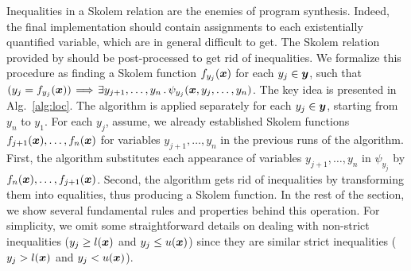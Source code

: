Inequalities in a Skolem relation are the enemies  of program synthesis.
Indeed, the final implementation should contain assignments to each
existentially quantified variable, which are in general difficult to
get. 
The Skolem relation provided by \aeval should be post-processed to get rid of inequalities.
We formalize this procedure as finding a Skolem function $f_{y_j}(\vx)$ for each $y_j\in \vy$, such that $(y_j = f_{y_j}(\vx)) \!\implies\! \exists y_{j+1},\ldots,y_{n} \such \psi_{y_j}(\vx,y_{j},\ldots,y_{n}) $.
The key idea is presented in Alg.~\ref{alg:loc}.
The algorithm is applied separately for each $y_j \in \vy$, starting from $y_n$ to $y_1$.
For each $y_j$, assume, we already established Skolem functions $f_{j+1}(\vx),\ldots,f_{n}(\vx)$ for variables $y_{j+1},\ldots,y_n$ in the previous runs of the algorithm. 
%
First, the algorithm substitutes each appearance of variables $y_{j+1},\ldots, y_{n}$ in $\psi_{y_j}$ by $f_{n}(\vx),\ldots,f_{j+1}(\vx)$.
Second, %
%
the algorithm gets rid of inequalities by transforming them into
equalities, thus producing a Skolem function. 
In the rest of the section, we show several fundamental rules and properties behind this operation.
For simplicity, we omit some straightforward details on dealing with
non-strict inequalities ($y_j \ge l(\vx)$ and $y_j \le u(\vx)$) since
they are similar strict inequalities ($y_j > l(\vx)$ and $y_j < u(\vx)$).

